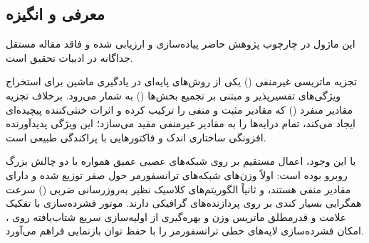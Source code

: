 \subsection{معرفی و انگیزه}
این ماژول در چارچوب پژوهش حاضر پیاده‌سازی و ارزیابی شده و فاقد مقاله مستقل جداگانه در ادبیات تحقیق است.

تجزیه ماتریسی غیرمنفی () یکی از روش‌های پایه‌ای در یادگیری ماشین برای استخراج ویژگی‌های تفسیرپذیر و مبتنی بر تجمیع بخش‌ها () به شمار می‌رود. برخلاف تجزیه مقادیر منفرد () که مقادیر مثبت و منفی را ترکیب کرده و اثرات خنثی‌کننده پیچیده‌ای ایجاد می‌کند،  تمام درایه‌ها را به مقادیر غیرمنفی مقید می‌سازد؛ این ویژگی پدیدآورنده افزونگی ساختاری اندک و فاکتورهایی با پراکندگی طبیعی است.

با این وجود، اعمال مستقیم  بر روی شبکه‌های عصبی عمیق همواره با دو چالش بزرگ روبرو بوده است: اولاً وزن‌های شبکه‌های ترانسفورمر حول صفر توزیع شده و دارای مقادیر منفی هستند، و ثانیاً الگوریتم‌های کلاسیک  نظیر به‌روزرسانی ضربی () سرعت همگرایی بسیار کندی بر روی پردازنده‌های گرافیکی دارند. موتور فشرده‌سازی  با تفکیک علامت و قدرمطلق ماتریس وزن و بهره‌گیری از اولیه‌سازی سریع  شتاب‌یافته روی ، امکان فشرده‌سازی لایه‌های خطی ترانسفورمر را با حفظ توان بازنمایی فراهم می‌آورد.
